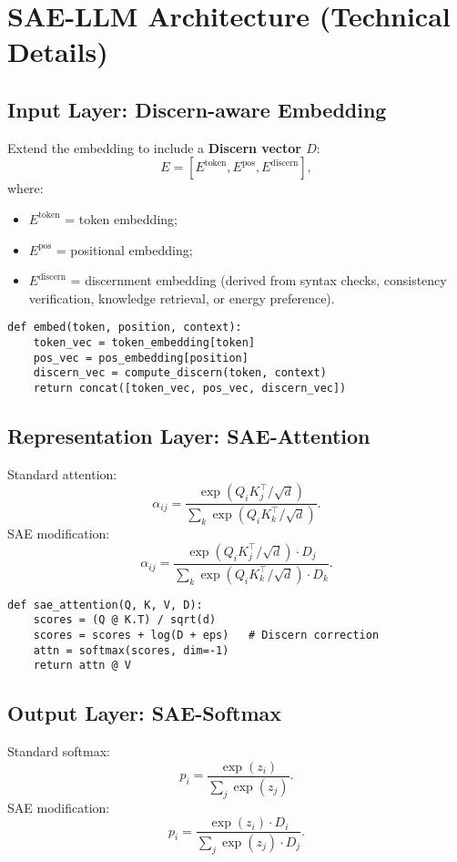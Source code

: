 \documentclass[11pt]{article}
\theoremstyle{plain}
\theoremstyle{definition}
\theoremstyle{remark}
\begin{document}
\section{SAE-LLM Architecture (Technical Details)}

\subsection{Input Layer: Discern-aware Embedding}
Extend the embedding to include a \textbf{Discern vector $D$}:
\[
E = [E^{\text{token}}, E^{\text{pos}}, E^{\text{discern}}],
\]
where:
\begin{itemize}
  \item $E^{\text{token}}$ = token embedding;
  \item $E^{\text{pos}}$ = positional embedding;
  \item $E^{\text{discern}}$ = discernment embedding (derived from syntax checks, consistency verification, knowledge retrieval, or energy preference).
\end{itemize}

\begin{verbatim}
def embed(token, position, context):
    token_vec = token_embedding[token]
    pos_vec = pos_embedding[position]
    discern_vec = compute_discern(token, context)
    return concat([token_vec, pos_vec, discern_vec])
\end{verbatim}

\subsection{Representation Layer: SAE-Attention}
Standard attention:
\[
\alpha_{ij} = \frac{\exp(Q_i K_j^\top / \sqrt{d})}{\sum_k \exp(Q_i K_k^\top / \sqrt{d})}.
\]
SAE modification:
\[
\alpha_{ij} = \frac{\exp(Q_i K_j^\top / \sqrt{d}) \cdot D_j}{\sum_k \exp(Q_i K_k^\top / \sqrt{d}) \cdot D_k}.
\]

\begin{verbatim}
def sae_attention(Q, K, V, D):
    scores = (Q @ K.T) / sqrt(d)
    scores = scores + log(D + eps)   # Discern correction
    attn = softmax(scores, dim=-1)
    return attn @ V
\end{verbatim}

\subsection{Output Layer: SAE-Softmax}
Standard softmax:
\[
p_i = \frac{\exp(z_i)}{\sum_j \exp(z_j)}.
\]
SAE modification:
\[
p_i = \frac{\exp(z_i) \cdot D_i}{\sum_j \exp(z_j) \cdot D_j}.
\]
\end{document}
